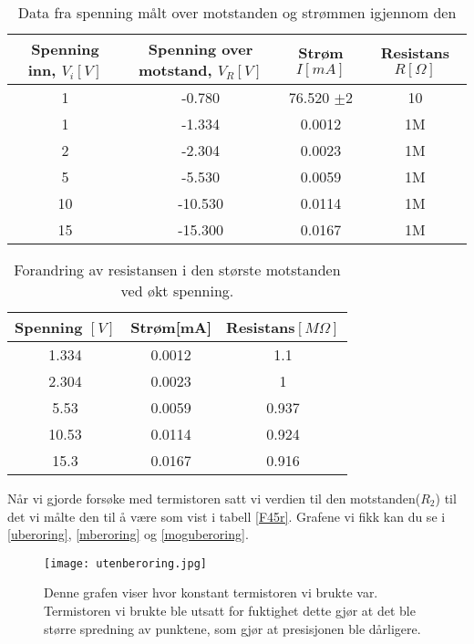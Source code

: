 \documentclass[norsk,a4paper,12pt]{article}
\begin{document}
\begin{table}[h!]
 	 \centering
 	 \caption[Spenning over motstand og strøm igjennom]{Data fra spenning målt over motstanden 
	 og strømmen igjennom den}
  		\begin{tabular}{|c|c|c|c|} \hline
  		\textbf{Spenning inn, $V_i[V]$} &\textbf{Spenning over motstand, $V_R[V]$} 
		&\textbf{Strøm $I[mA]$}&\textbf{Resistans $R[\Omega]$} \\ \hline
  		1 &  -0.780 & 76.520 $\pm$2 &10\\ 
		1 &  -1.334 & 0.0012 &1M\\ 
		2 &  -2.304 & 0.0023 &1M\\ 
		5 &  -5.530 & 0.0059 &1M\\ 
		10 & -10.530 & 0.0114 &1M\\ 
		15 & -15.300 & 0.0167 &1M \\ \hline
  		\end{tabular}
	\label{SMS}
\end{table}

\begin{table}[h!]
 	 \centering
 	 \caption[$\Delta \Omega$]{Forandring av resistansen i den største motstanden ved økt 
	 spenning.}
  		\begin{tabular}{|c|c|c|} \hline
  		\textbf{Spenning $[V]$} &\textbf{Strøm[mA]}&\textbf{Resistans$[M\Omega]$} \\ \hline
  		1.334& 0.0012 & 1.1 \\ 
		2.304& 0.0023 & 1\\
		5.53& 0.0059 & 0.937\\
		10.53& 0.0114 & 0.924 \\
		 15.3& 0.0167 & 0.916 \\ \hline
  		\end{tabular}
	\label{forskjell}
\end{table}

Når vi gjorde forsøke med termistoren satt vi verdien til den motstanden($R_2$) til det vi målte den til å være som vist i tabell \vref{F45r}. Grafene vi fikk kan du se i \vref{uberoring}, \vref{mberoring} og \vref{moguberoring}. 

\begin{figure}
	\begin{center}
  	\texttt{[image: utenberoring.jpg]}\\
 	\caption[Termistor uten berøring]{Denne grafen viser hvor konstant termistoren vi brukte var. 
	Termistoren vi brukte ble utsatt for fuktighet dette gjør at det ble større spredning av punktene, 
	som gjør at presisjonen ble dårligere.}
	\label{uberoring}
	\end{center}
\end{figure}
\end{document}
